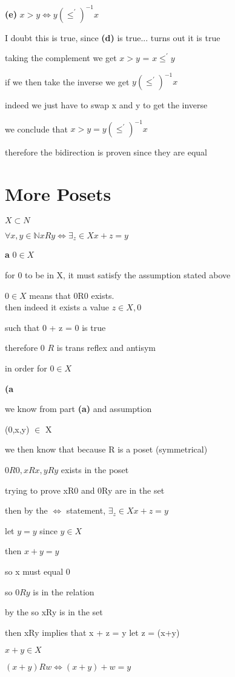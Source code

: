 \documentclass[12pts,A4]{article}
\begin{document}
\begin{flushleft}
    \bigskip

\textbf{(e)} $ x > y \iff y (\leq^{'})^{-1} x $ 
    
    I doubt this is true, since \textbf{(d)} is true...
    turns out it is true


    
    taking the complement we get  $ x > y$ = $ x \leq ^{'} y $
   
    if we then take the inverse we get $ y (\leq ^{'} )^{-1} x $
    
    indeed we just have to swap x and y to get the inverse
    
    \bigskip

    we conclude that $ x > y =  y (\leq^{'})^{-1} x $  

    therefore the bidirection is proven since they are equal


\end{flushleft}
\section {More Posets}

\begin{flushleft}
    
    $ X \subset N $

    $ \forall x,y \in \mathbb{N} xRy \iff \exists_{z} \in X x+z = y$

    \textbf{a} $0 \in X$

    for 0 to be in X, it must satisfy the assumption stated above
     
    $0 \in X$ means that 0R0 exists.\\
    then indeed it exists a value $ z \in X, 0$

    such that 0 + z = 0 is true
    
    therefore 0 
    $R$ is trans reflex and antisym 

    in order for $ 0 \in X$ 

    \textbf{(a} 
    
    we know from part \textbf{(a)}  and assumption


    (0,x,y) $\in$ X
    
    we then know that because R is a poset (symmetrical)

    $ 0R0 , xRx, yRy $ exists in the poset
    

    trying to prove 
    xR0 and 0Ry are in the set

    then by the $\iff$ statement, $\exists_{z} \in X x+z  = y$

    let $y = y$  since $ y \in X$

    then $ x + y = y$ 
    
    so x must equal 0

    so $0Ry$ is in the relation

    by the 
    so xRy is in the set

    then xRy implies that x + z = y
    let z = (x+y)
    
    $ x+ y \in X$

    $ (x+y) R w \iff (x+y)+w = y$

    
\end{flushleft}
\end{document}
